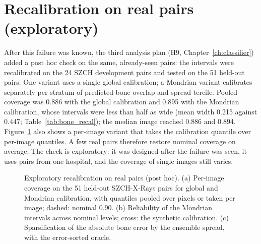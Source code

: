 \section{Recalibration on real pairs (exploratory)}
After this failure was known, the third analysis plan (H9, Chapter~\ref{ch:classifier}) added a post hoc check on the same, already-seen
pairs: the intervals were recalibrated on the 24 SZCH development pairs and tested on the 51 held-out pairs. One variant uses a single global
calibration; a Mondrian variant calibrates separately per stratum of predicted bone overlap and spread tercile. Pooled coverage was 0.886
with the global calibration and 0.895 with the Mondrian calibration, whose intervals were less than half as wide (mean width 0.215 against
0.447; Table~\ref{tab:bone_recal}); the median image reached 0.886 and 0.894. Figure~\ref{fig:bone_recal} also shows a per-image variant that
takes the calibration quantile over per-image quantiles. A few real pairs therefore restore nominal coverage on average. The check is
exploratory: it was designed after the failure was seen, it uses pairs from one hospital, and the coverage of single images still varies.
\begin{table}[htbp]
\centering\small
\caption{Exploratory recalibration on real pairs (post hoc): bone-image intervals calibrated on the 24 SZCH-X-Rays development pairs and tested
on the 51 held-out pairs at nominal 0.90. Mondrian: calibration per stratum of predicted bone overlap and ensemble spread.}
\label{tab:bone_recal}
\end{table}
\begin{figure}[htbp]
\centering
{}
\caption{Exploratory recalibration on real pairs (post hoc). (a) Per-image coverage on the 51 held-out SZCH-X-Rays pairs for global and
Mondrian calibration, with quantiles pooled over pixels or taken per image; dashed: nominal 0.90. (b) Reliability of the Mondrian intervals
across nominal levels; cross: the synthetic calibration. (c) Sparsification of the absolute bone error by the ensemble spread, with the
error-sorted oracle.}
\label{fig:bone_recal}
\end{figure}

